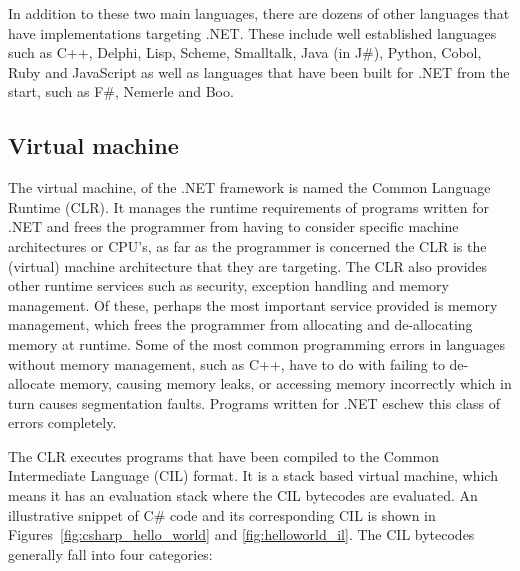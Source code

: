 	In addition to these two main languages, there are dozens of other 
	languages that have implementations targeting .NET. These include well 
	established languages such as C++, Delphi, Lisp, Scheme, Smalltalk, Java 
	(in J\#), Python, Cobol, Ruby and JavaScript as well as languages that have 
	been built for .NET from the start, such as F\#, Nemerle and Boo.

\subsection{Virtual machine}

	The virtual machine, of the .NET framework is named the Common Language 
	Runtime (CLR). It manages the runtime requirements of programs written for 
	.NET and frees the programmer from having to consider specific machine 
	architectures or CPU's, as far as the programmer is concerned the CLR is the 
	(virtual) machine architecture that they are targeting. The CLR also 
	provides other runtime services such as security, exception handling and 
	memory management. Of these, perhaps the most important service provided is 
	memory management, which frees the programmer from allocating and 
	de-allocating memory at runtime. Some of the most common programming errors 
	in languages without memory management, such as C++, have to do with failing 
	to de-allocate memory, causing memory leaks, or accessing memory incorrectly 
	which in turn causes segmentation faults. Programs written for .NET eschew 
	this class of errors completely.
	
	The CLR executes programs that have been compiled to the Common Intermediate 
	Language (CIL) format. It is a stack based virtual machine, which means it 
	has an evaluation stack where the CIL bytecodes are evaluated. An 
	illustrative snippet of C\# code and its corresponding CIL is shown in 
	Figures~\ref{fig:csharp_hello_world} and \ref{fig:helloworld_il}. The CIL 
	bytecodes generally fall into four categories:
		
